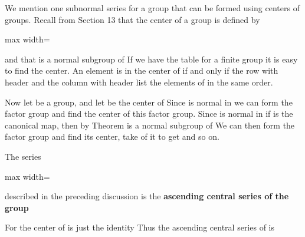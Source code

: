 \documentclass[11pt,oneside]{article}
\begin{document}
\begin{BookBody}
\noindent We mention one subnormal series for a group  that can be formed using centers of groups. Recall from Section 13 that the center  of a group  is defined by

\begin{center}\begin{adjustbox}{max width=\linewidth}\end{adjustbox}\end{center}

\noindent and that  is a normal subgroup of  If we have the table for a finite group  it is easy to find the center. An element  is in the center of  if and only if the row with header  and the column with header  list the elements of  in the same order.

Now let  be a group, and let  be the center of  Since  is normal in  we can form the factor group  and find the center  of this factor group. Since  is normal in  if  is the canonical map, then by Theorem  is a normal subgroup  of  We can then form the factor group  and find its center, take  of it to get  and so on.

 The series

\begin{center}\begin{adjustbox}{max width=\linewidth}\end{adjustbox}\end{center}

\noindent described in the preceding discussion is the\textbf{ ascending central series of the group}  \BookEnd{\blacksquare}

 For  the center of  is just the identity  Thus the ascending central series of  is


\end{BookBody}
\end{document}

